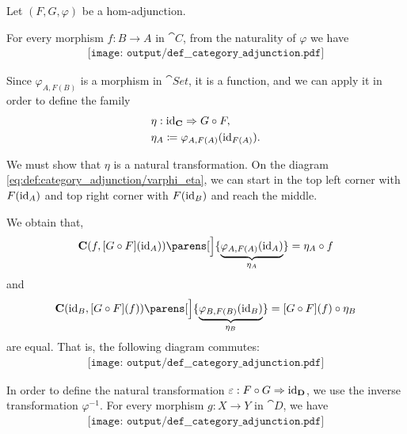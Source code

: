 \begin{defproof}
   Let \( (F, G, \varphi) \) be a hom-adjunction.

  For every morphism \( f: B \to A \) in \( \cat{C} \), from the naturality of \( \varphi \) we have
  \begin{equation}\label{eq:def:category_adjunction/varphi_eta}
    \begin{aligned}
      \texttt{[image: output/def\_\_category\_adjunction.pdf]}
    \end{aligned}
  \end{equation}

  Since \( \varphi_{A,F(B)} \) is a morphism in \( \cat{Set} \), it is a function, and we can apply it in order to define the family
  \begin{equation*}
    \begin{aligned}
      &\eta: \id_{\cat{C}} \Rightarrow G \bincirc F, \\
      &\eta_A \coloneqq \varphi_{A,F(A)}(\id_{F(A)}).
    \end{aligned}
  \end{equation*}

  We must show that \( \eta \) is a natural transformation. On the diagram \eqref{eq:def:category_adjunction/varphi_eta}, we can start in the top left corner with \( F(\operatorname{id}_A) \) and top right corner with \( F(\operatorname{id}_B) \) and reach the middle.

  We obtain that,
  \begin{equation*}
    \cat{C}(f, [G \bincirc F](\id_A))\parens[\Big]{ \underbrace{\varphi_{A, F(A)}(\id_A)}_{\eta_A} }
    =
    \eta_A \bincirc f
  \end{equation*}
  and
  \begin{equation*}
    \cat{C}(\id_B, [G \bincirc F](f))\parens[\Big]{ \underbrace{\varphi_{B, F(B)}(\id_B)}_{\eta_B} }
    =
    [G \bincirc F](f) \bincirc \eta_B
  \end{equation*}
  are equal. That is, the following diagram commutes:
  \begin{equation}\label{eq:def:category_adjunction/eta_nat}
    \begin{aligned}
      \texttt{[image: output/def\_\_category\_adjunction.pdf]}
    \end{aligned}
  \end{equation}

  In order to define the natural transformation \( \varepsilon: F \bincirc G \Rightarrow \id_{\cat{D}} \), we use the inverse transformation \( \varphi^{-1} \). For every morphism \( g: X \to Y \) in \( \cat{D} \), we have
  \begin{equation}\label{eq:def:category_adjunction/varphi_varepsilon}
    \begin{aligned}
      \texttt{[image: output/def\_\_category\_adjunction.pdf]}
    \end{aligned}
  \end{equation}


\end{defproof}
